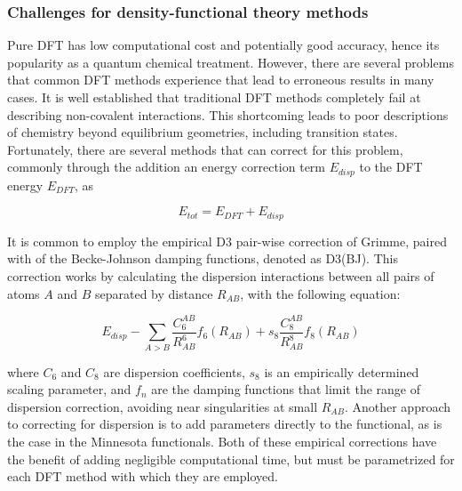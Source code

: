 \subsubsection{Challenges for density-functional theory methods}

Pure DFT has low computational cost and potentially good accuracy, hence its
popularity as a quantum chemical treatment. However, there are several problems
that common DFT methods experience that lead to erroneous results in many
cases.\cite{Cohen2012} It is well established that traditional DFT methods
completely fail at describing non-covalent
interactions.\cite{DiLabio2016,OterodelaRoza2017} This shortcoming leads to
poor descriptions of chemistry beyond equilibrium geometries, including
transition states. Fortunately, there are several methods that can correct for
this problem, commonly through the addition an energy correction term
$E_{disp}$ to the DFT energy $E_{DFT}$, as

\begin{equation}
  E_{tot} = E_{DFT} + E_{disp}
\end{equation}

\noindent It is common to employ the empirical D3 pair-wise correction of
Grimme,\cite{Grimme2010} paired with of the Becke-Johnson damping
functions,\cite{Johnson2006} denoted as D3(BJ). This correction works by
calculating the dispersion interactions between all pairs of atoms $A$ and $B$
separated by distance $R_{AB}$, with the following equation:

\begin{equation}
  E_{disp} - \sum_{A>B} \frac{C_6^{AB}}{R_{AB}^6} f_6(R_{AB}) + s_8
  \frac{C_8^{AB}}{R_{AB}^8} f_8(R_{AB})
\end{equation}

\noindent where $C_6$ and $C_8$ are dispersion coefficients, $s_8$ is an
empirically determined scaling parameter, and $f_n$ are the damping functions
that limit the range of dispersion correction, avoiding near singularities at
small $R_{AB}$. Another approach to correcting for dispersion is to add
parameters directly to the functional, as is the case in the Minnesota
functionals.\cite{Zhao2006,Zhao2006} Both of these empirical corrections have
the benefit of adding negligible computational time, but must be parametrized
for each DFT method with which they are employed.


